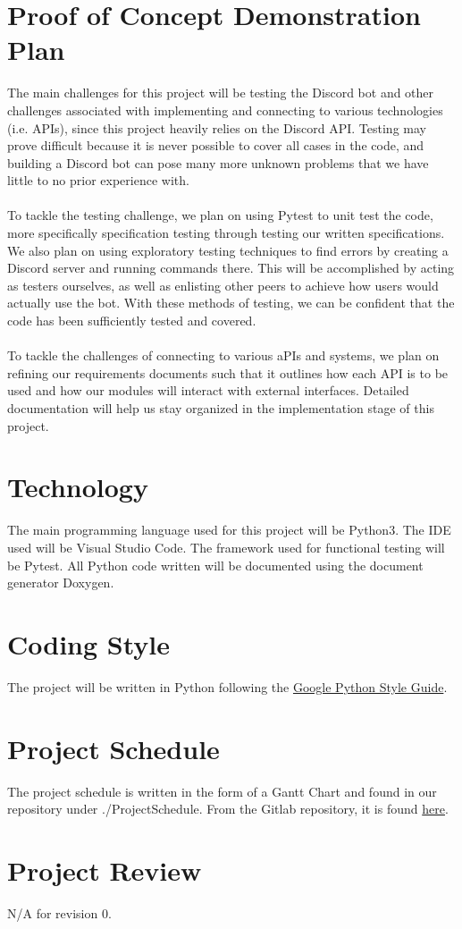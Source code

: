 \documentclass{article}
\begin{document}
\section{Proof of Concept Demonstration Plan}
The main challenges for this project will be testing the Discord bot and other challenges associated with implementing and connecting to various technologies (i.e. APIs), since this project heavily relies on the Discord API. Testing may prove difficult because it is never possible to cover all cases in the code, and building a Discord bot can pose many more unknown problems that we have little to no prior experience with.\\ \\
To tackle the testing challenge, we plan on using Pytest to unit test the code, more specifically specification testing through testing our written specifications. We also plan on using exploratory testing techniques to find errors by creating a Discord server and running commands there. This will be accomplished by acting as testers ourselves, as well as enlisting other peers to achieve how users would actually use the bot. With these methods of testing, we can be confident that the code has been sufficiently tested and covered.\\ \\
To tackle the challenges of connecting to various aPIs and systems, we plan on refining our requirements documents such that it outlines how each API is to be used and how our modules will interact with external interfaces. Detailed documentation will help us stay organized in the implementation stage of this project.


\section{Technology}
The main programming language used for this project will be Python3. The IDE used will be Visual Studio Code. The framework used for functional testing will be Pytest. All Python code written will be documented using the document generator Doxygen.

\section{Coding Style}
The project will be written in Python following the \href{https://google.github.io/styleguide/pyguide.html}{Google Python Style Guide}.

\section{Project Schedule}
The project schedule is written in the form of a Gantt Chart and found in our repository under ./ProjectSchedule. From the Gitlab repository, it is found \href{https://gitlab.cas.mcmaster.ca/modia1/ScrumBot/tree/master/ProjectSchedule}{here}.

\section{Project Review}
N/A for revision 0.
\end{document}
